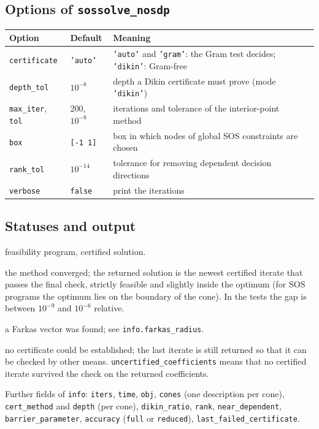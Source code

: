 \documentclass[11pt,a4paper]{article}
\newcommand{\code}[1]{\texttt{#1}}
\begin{document}
\subsection{Options of \texttt{sossolve\_nosdp}}
\begin{center}\small
\begin{tabular}{lll}
\toprule
Option & Default & Meaning\\
\midrule
\code{certificate} & \code{'auto'} & \code{'auto'} and \code{'gram'}: the Gram test decides; \code{'dikin'}: Gram-free\\
\code{depth\_tol} & $10^{-8}$ & depth a Dikin certificate must prove (mode \code{'dikin'})\\
\code{max\_iter}, \code{tol} & 200, $10^{-8}$ & iterations and tolerance of the interior-point method\\
\code{box} & \code{[-1 1]} & box in which nodes of global SOS constraints are chosen\\
\code{rank\_tol} & $10^{-14}$ & tolerance for removing dependent decision directions\\
\code{verbose} & \code{false} & print the iterations\\
\bottomrule
\end{tabular}
\end{center}

\subsection{Statuses and output}
\begin{description}[itemsep=2pt]
\item[\code{feasible}] feasibility program, certified solution.
\item[\code{optimal}] the method converged; the returned solution is the newest certified iterate that passes the final check, strictly feasible and slightly inside the optimum (for SOS programs the optimum lies on the boundary of the cone). In the tests the gap is between $10^{-9}$ and $10^{-6}$ relative.
\item[\code{infeasible}] a Farkas vector was found; see \code{info.farkas\_radius}.
\item[\code{uncertified\_*}] no certificate could be established; the last iterate is still returned so that it can be checked by other means. \code{uncertified\_coefficients} means that no certified iterate survived the check on the returned coefficients.
\end{description}
Further fields of \code{info}: \code{iters}, \code{time}, \code{obj}, \code{cones} (one description per cone), \code{cert\_method} and \code{depth} (per cone), \code{dikin\_ratio}, \code{rank}, \code{near\_dependent}, \code{barrier\_parameter}, \code{accuracy} (\code{full} or \code{reduced}), \code{last\_failed\_certificate}.
\end{document}
